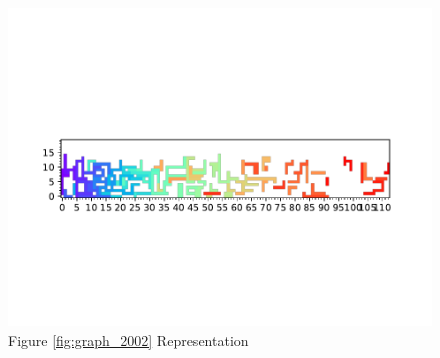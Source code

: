 \documentclass{standalone}
\begin{document}
\begin{figure}[!htb]
	\caption{Figure \ref{fig:graph_2002} Representation}
	\label{fig:picture_2002}
	\includegraphics[width=\textwidth]{../graphs/picture/2002.pdf}
\end{figure}
\end{document}
